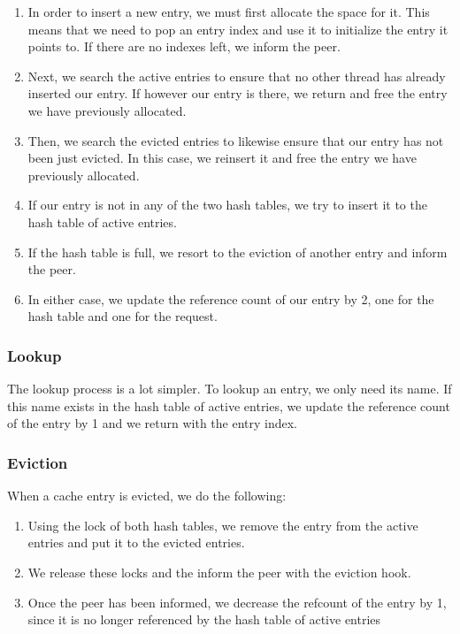 \begin{enumerate}
	\item In order to insert a new entry, we must first allocate the space 
		for it. This means that we need to pop an entry index and use 
		it to initialize the entry it points to. If there are no 
		indexes left, we inform the peer.
	\item Next, we search the active entries to ensure that no other thread 
		has already inserted our entry. If however our entry is there, 
		we return and free the entry we have previously allocated.
	\item Then, we search the evicted entries to likewise ensure that our entry 
		has not been just evicted. In this case, we reinsert it and free the 
		entry we have previously allocated.
	\item If our entry is not in any of the two hash tables, we try to insert 
		it to the hash table of active entries.
	\item If the hash table is full, we resort to the eviction of another 
		entry and inform the peer.
	\item In either case, we update the reference count of our entry by 2, 
		one for the hash table and one for the request.
\end{enumerate}

\subsubsection{Lookup}

The lookup process is a lot simpler. To lookup an entry, we only need its name.  
If this name exists in the hash table of active entries, we update the 
reference count of the entry by 1 and we return with the entry index.

\subsubsection{Eviction}

When a cache entry is evicted, we do the following:

\begin{enumerate}
	\item Using the lock of both hash tables, we remove the entry from the 
		active entries and put it to the evicted entries.
	\item We release these locks and the inform the peer with the eviction 
		hook.
	\item Once the peer has been informed, we decrease the refcount of the
		entry by 1, since it is no longer referenced by the hash table 
		of active entries
\end{enumerate}

